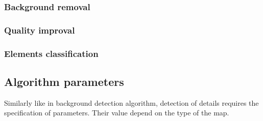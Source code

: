 \documentclass[a4paper,onecolumn,oneside,12pt]{memoir}
\begin{document}
\subsubsection{Background removal}



\subsubsection{Quality improval}

\subsubsection{Elements classification}

\subsection{Algorithm parameters}

Similarly like in background detection algorithm, detection of details requires the specification of
parameters. Their value depend on the type of the map.
\end{document}
